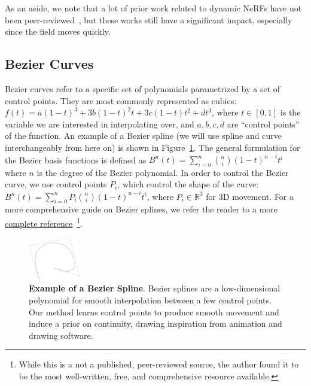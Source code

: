 As an aside, we note that a lot of prior work related to dynamic NeRFs have not been peer-reviewed~\cite{pumarola2020dnerf,li2021neural,park2021nerfies,neural3dViewSynthesis}, but these works still have a significant impact, especially since the field moves quickly.

\subsection*{Bezier Curves}
Bezier curves refer to a specific set of polynomials parametrized by a set of control points. They are most commonly represented as cubics: $f(t) = a(1-t)^3 + 3b(1-t)^2t + 3c(1-t)t^2 + dt^3$,
where $t\in[0,1]$ is the variable we are interested in interpolating over, and $a,b,c,d$ are ``control points'' of the function. An example of a Bezier spline (we will use spline and curve interchangeably from here on) is shown in Figure~\ref{fig:bezier_diagram}. The general formulation for
the Bezier basis functions is defined as $B^n(t) = \sum\limits^n_{i=0} {n \choose i} (1-t)^{n-i} t^i$ where $n$
is the degree of the Bezier polynomial. In order to control the Bezier curve, we use control points $P_i$, which control the shape of the curve: $B^n(t) = \sum\limits_{i=0}^n P_i {n \choose i} (1-t)^{n-i} t^i$, where $P_i\in\mathbb{R}^3$ for 3D movement. For a more comprehensive guide on Bezier splines, we refer the reader to a more
\href{https://pomax.github.io/bezierinfo/index.html}{complete reference}~\cite{bezier_primer}\footnote{While this is a not a published, peer-reviewed source, the author found it to be the most well-written, free, and comprehensive resource available.}.

\begin{figure}
    \centering
    \includegraphics[width=0.2\textwidth]{bezier_curve.png}
    \caption{
        \textbf{Example of a Bezier Spline}.
        Bezier splines are a low-dimensional polynomial for smooth interpolation between a few control points. Our method learns control points to produce smooth movement and induce a prior on continuity, drawing inspiration from animation and drawing software.
    }
    \label{fig:bezier_diagram}
\end{figure}


